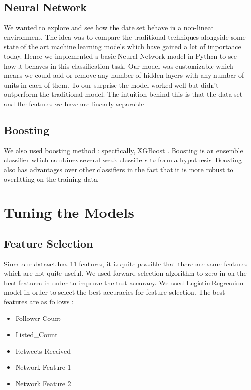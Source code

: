 \documentclass[conference]{IEEEtran}
\numberwithin{equation}{section}
\numberwithin{figure}{section}
\numberwithin{table}{section}
\begin{document}
\subsection{Neural Network}\label{sec:colour-illustrations}
We wanted to explore and see how the date set behave in a non-linear environment. The idea was to compare the traditional techniques alongside some state of the art machine learning models which have gained a lot of importance today. Hence we implemented a basic Neural Network model in Python to see how it behaves in this classification task. Our model was customizable which means we could add or remove any number of hidden layers with any number of units in each of them. To our surprise the model worked well but didn't outperform the traditional model. The intuition behind this is that the data set and the features we have are linearly separable. 

\subsection{Boosting}
We also used boosting method : specifically, XGBoost \cite{xgboost}. Boosting is an ensemble classifier which combines several weak classifiers to form a hypothesis. Boosting also has advantages over other classifiers in the fact that it is more robust to overfitting on the training data. 

\section{Tuning the Models}
\subsection{Feature Selection}
Since our dataset has 11 features, it is quite possible that there are some features which are not quite useful. We used forward selection algorithm to zero in on the best features in order to improve the test accuracy. We used Logistic Regression model in order to select the best accuracies for feature selection. The best features are as follows :
\begin{itemize}
\item Follower Count
\item Listed\_Count
\item Retweets Received
\item Network Feature 1
\item Network Feature 2
\end{itemize}
\end{document}
